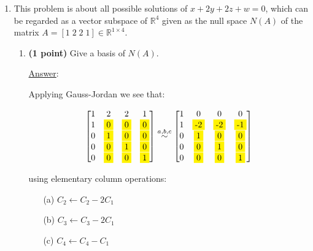 \documentclass[]{book}
\theoremstyle{definition}
\newcommand{\rank}[1]{\textrm{rank}({#1})}
\newcommand\yellow[1]{\colorbox{yellow}{#1}}
\newcommand\ans{\underline{Answer}: }
\begin{document}
\begin{enumerate}
\ans

First observe that $\rank{A} = \rank{A^t}=5$.
Let's write down the fundamental theorem of linear algebra for both matrices $A$ and $A^t$:
\[
9 = \dim{N(A)} + \rank{A} \Rightarrow \dim{N(A)} = 9 - 5 = 4
\]
\[
7 = \dim{N(A^t)} + \rank{A^t} \Rightarrow \dim{N(A^t)} = 7 - 5 = 2
\]

The index of $A$ is $\dim{N(A)} - \dim{N(A^t)} = 4 - 2 = 2$.



\item This problem is about all possible solutions of $x + 2y + 2z + w = 0$, which can be regarded as a vector subspace of $\mathbb{R}^4$ given as the null space $N(A)$ of the matrix $A = \left[1\; 2\; 2\; 1\right]\in\mathbb{R}^{1\times 4}$. 


\begin{enumerate}

\item {\bf (1 point)} Give a basis of $N(A)$.

\ans

Applying Gauss-Jordan we see that:

\[
{\begin{bmatrix}
1 & 2 & 2 & 1\\
1 & \yellow{0} & \yellow{0} & \yellow{0} \\
0 &\yellow{1} &\yellow{0} &  \yellow{0} \\
0  & \yellow{0} & \yellow{1} &  \yellow{0} \\
0  & \yellow{0} & \yellow{0} &  \yellow{1} \\
  \end{bmatrix}
}
\stackrel{a,b,c}{\sim}
{\begin{bmatrix}
1 & 0 & 0 & 0 \\
1 & \yellow{-2} & \yellow{-2} & \yellow{-1} \\
0 &\yellow{1} &\yellow{0} &  \yellow{0} \\
0  & \yellow{0} & \yellow{1} &  \yellow{0} \\
0  & \yellow{0} & \yellow{0} &  \yellow{1} \\
  \end{bmatrix}
}
\]
 
using elementary column operations: 
\begin{enumerate}
\item[(a)] $C_2 \leftarrow C_2 - 2C_1$
\item[(b)] $C_3 \leftarrow C_3 - 2C_1$
\item[(c)] $C_4 \leftarrow C_4 - C_1$
\end{enumerate}


\end{enumerate}
\end{enumerate}
\end{document}
